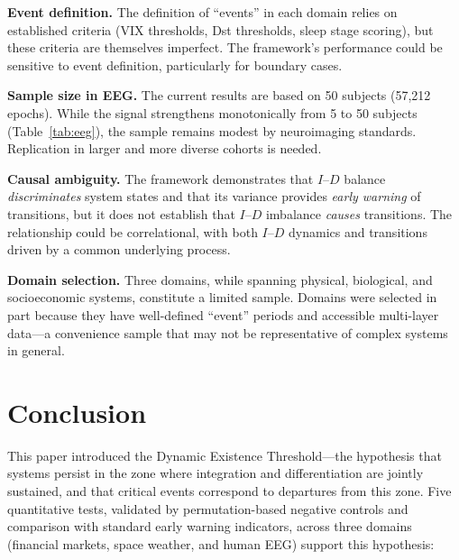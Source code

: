\documentclass[aip,cha,reprint,amsmath,amssymb,final]{revtex4-2}
\begin{document}
\textbf{Event definition.} The definition of ``events'' in each domain relies on established criteria (VIX thresholds, Dst thresholds, sleep stage scoring), but these criteria are themselves imperfect. The framework's performance could be sensitive to event definition, particularly for boundary cases.

\textbf{Sample size in EEG.} The current results are based on 50 subjects (57,212 epochs). While the signal strengthens monotonically from 5 to 50 subjects (Table~\ref{tab:eeg}), the sample remains modest by neuroimaging standards. Replication in larger and more diverse cohorts is needed.

\textbf{Causal ambiguity.} The framework demonstrates that $I$--$D$ balance \emph{discriminates} system states and that its variance provides \emph{early warning} of transitions, but it does not establish that $I$--$D$ imbalance \emph{causes} transitions. The relationship could be correlational, with both $I$--$D$ dynamics and transitions driven by a common underlying process.

\textbf{Domain selection.} Three domains, while spanning physical, biological, and socioeconomic systems, constitute a limited sample. Domains were selected in part because they have well-defined ``event'' periods and accessible multi-layer data---a convenience sample that may not be representative of complex systems in general.


\section{Conclusion}

This paper introduced the Dynamic Existence Threshold---the hypothesis that systems persist in the zone where integration and differentiation are jointly sustained, and that critical events correspond to departures from this zone. Five quantitative tests, validated by permutation-based negative controls and comparison with standard early warning indicators, across three domains (financial markets, space weather, and human EEG) support this hypothesis:
\end{document}
